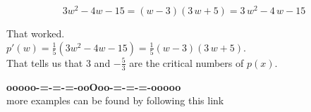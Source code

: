 \documentclass{ximera}
\begin{document}
\[
3w^2 - 4w - 15     = (w - 3)(3 \, w + 5) = 3 \, w^2  -4 \, w - 15
\]



That worked. \\



$p'(w) = \frac{1}{5}(3w^2 - 4w - 15) = \frac{1}{5} (w - 3)(3 \, w + 5)$. \\


That tells us that $3$ and $-\frac{5}{3}$ are the critical numbers of $p(x)$.







\begin{onlineOnly}
\begin{center}
\textbf{\textcolor{green!50!black}{ooooo-=-=-=-ooOoo-=-=-=-ooooo}} \\

more examples can be found by following this link\\ 

\end{center}
\end{onlineOnly}
\end{document}
